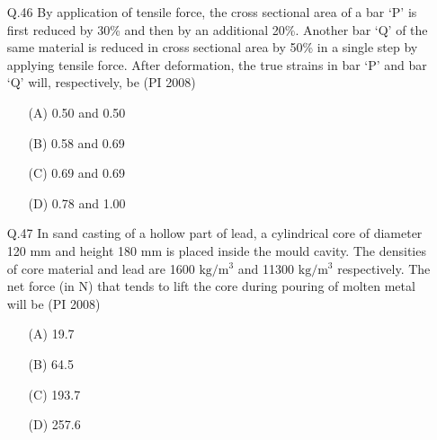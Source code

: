 \documentclass[journal,12pt,onecolumn]{IEEEtran}
\theoremstyle{remark}
\begin{document}
\begin{enumerate}
\item[\textnormal{Q.46}]
By application of tensile force, the cross sectional area of a bar `P' is first reduced by 30\% and then by an additional 20\%. Another bar `Q' of the same material is reduced in cross sectional area by 50\% in a single step by applying tensile force. After deformation, the true strains in bar `P' and bar `Q' will, respectively, be  \hfill{(PI 2008)}
\begin{multicols}{4}
    \begin{enumerate}[label=(\Alph*)]
\item[(A)] 0.50 and 0.50
\item[(B)] 0.58 and 0.69
\item[(C)] 0.69 and 0.69
\item[(D)] 0.78 and 1.00
\end{enumerate}
    \end{multicols}
\vspace{1cm}

\item[\textnormal{Q.47}]
In sand casting of a hollow part of lead, a cylindrical core of diameter 120 mm and height 180 mm is placed inside the mould cavity. The densities of core material and lead are 1600 $\mathrm{kg/m^3}$ and 11300 $\mathrm{kg/m^3}$ respectively. The net force (in N) that tends to lift the core during pouring of molten metal will be  \hfill{(PI 2008)}
\begin{multicols}{4}
    \begin{enumerate}[label=(\Alph*)]
\item[(A)] 19.7
\item[(B)] 64.5
\item[(C)] 193.7
\item[(D)] 257.6
\end{enumerate}
\end{multicols}
\vspace{1cm}


\end{enumerate}
\end{document}
